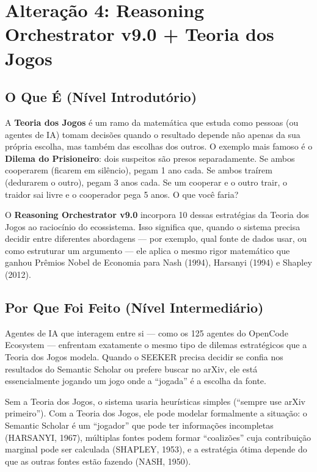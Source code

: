 \documentclass[12pt,a4paper]{article}
\begin{document}
\section{Alteração 4: Reasoning Orchestrator v9.0 + Teoria dos Jogos}

\subsection{O Que É (Nível Introdutório)}

A \textbf{Teoria dos Jogos} é um ramo da matemática que estuda como pessoas (ou agentes de IA) tomam decisões quando o resultado depende não apenas da sua própria escolha, mas também das escolhas dos outros. O exemplo mais famoso é o \textbf{Dilema do Prisioneiro}: dois suspeitos são presos separadamente. Se ambos cooperarem (ficarem em silêncio), pegam 1 ano cada. Se ambos traírem (dedurarem o outro), pegam 3 anos cada. Se um cooperar e o outro trair, o traidor sai livre e o cooperador pega 5 anos. O que você faria?

O \textbf{Reasoning Orchestrator v9.0} incorpora 10 dessas estratégias da Teoria dos Jogos ao raciocínio do ecossistema. Isso significa que, quando o sistema precisa decidir entre diferentes abordagens --- por exemplo, qual fonte de dados usar, ou como estruturar um argumento --- ele aplica o mesmo rigor matemático que ganhou Prêmios Nobel de Economia para Nash (1994), Harsanyi (1994) e Shapley (2012).

\subsection{Por Que Foi Feito (Nível Intermediário)}

Agentes de IA que interagem entre si --- como os 125 agentes do OpenCode Ecosystem --- enfrentam exatamente o mesmo tipo de dilemas estratégicos que a Teoria dos Jogos modela. Quando o SEEKER precisa decidir se confia nos resultados do Semantic Scholar ou prefere buscar no arXiv, ele está essencialmente jogando um jogo onde a ``jogada'' é a escolha da fonte.

Sem a Teoria dos Jogos, o sistema usaria heurísticas simples (``sempre use arXiv primeiro''). Com a Teoria dos Jogos, ele pode modelar formalmente a situação: o Semantic Scholar é um ``jogador'' que pode ter informações incompletas (HARSANYI, 1967), múltiplas fontes podem formar ``coalizões'' cuja contribuição marginal pode ser calculada (SHAPLEY, 1953), e a estratégia ótima depende do que as outras fontes estão fazendo (NASH, 1950).
\end{document}
